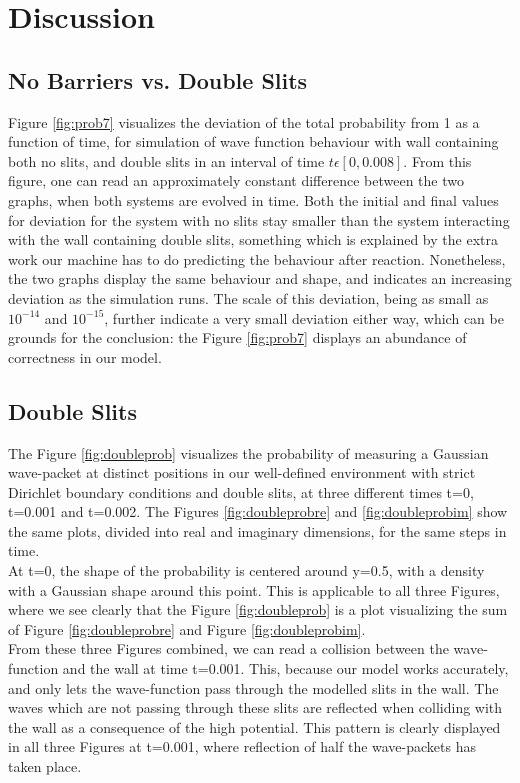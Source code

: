 \documentclass[10pt, nofootinbib, twocolumn]{revtex4-1}
\begin{document}
\section{Discussion}\label{sec:discussion}
\subsection{No Barriers vs. Double Slits}
Figure \ref{fig:prob7} visualizes the deviation of the total probability from 1 as a function of time, for simulation of wave function behaviour with wall containing both no slits, and double slits in an interval of time $t\epsilon [0,0.008]$. From this figure, one can read an approximately constant difference between the two graphs, when both systems are evolved in time. Both the initial and final values for deviation for the system with no slits stay smaller than the system interacting with the wall containing double slits, something which  is explained by the extra work our machine has to do predicting the behaviour after reaction. Nonetheless, the two graphs display the same behaviour and shape, and indicates an increasing deviation as the simulation runs. The scale of this deviation, being as small as $10^{-14}$ and $10^{-15}$, further indicate a very small deviation either way, which can be grounds for the conclusion: the Figure \ref{fig:prob7} displays an abundance of correctness in our model. 



\subsection{Double Slits}
The Figure \ref{fig:doubleprob} visualizes the probability of measuring a Gaussian wave-packet at distinct positions in our well-defined environment with strict Dirichlet boundary conditions and double slits, at three different times t=0, t=0.001 and t=0.002. The Figures \ref{fig:doubleprobre} and \ref{fig:doubleprobim} show the same plots, divided into real and imaginary dimensions, for the same steps in time. \\

At t=0, the shape of the probability is centered around y=0.5, with a density with a Gaussian shape around this point. This is applicable to all three Figures, where we see clearly that the Figure \ref{fig:doubleprob} is a plot visualizing the sum of Figure \ref{fig:doubleprobre} and Figure \ref{fig:doubleprobim}. \\

From these three Figures combined, we can read a collision between the wave-function and the wall at time t=0.001. This, because our model works accurately, and only lets the wave-function pass through the modelled slits in the wall. The waves which are not passing through these slits are reflected when colliding with the wall as a consequence of the high potential. This pattern is clearly displayed in all three Figures at t=0.001, where reflection of half the wave-packets has taken place. \\
\end{document}

